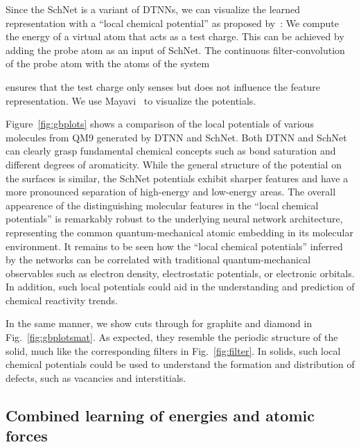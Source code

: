 \documentclass[aip,jcp,reprint,graphicx]{revtex4-1}
\begin{document}
Since the SchNet is a variant of DTNNs, we can visualize the learned representation with a ``local chemical potential''  as proposed by~\citet{schutt2017quantum}:
We compute the energy of a virtual atom that acts as a test charge.
This can be achieved by adding the probe atom  as an input of SchNet.
The continuous filter-convolution of the probe atom with the atoms of the system

ensures that the test charge only senses but does not influence the feature representation.
We use Mayavi~\cite{ramachandran2011mayavi} to visualize the potentials.

Figure~\ref{fig:gbplots} shows a comparison of the local potentials of various molecules from QM9 generated by DTNN and SchNet. Both DTNN and SchNet can clearly grasp fundamental chemical concepts such as bond saturation and different degrees of aromaticity. While the general structure of the potential on the surfaces is similar, the SchNet potentials exhibit sharper features and have a more pronounced separation of high-energy and low-energy areas. The overall appearence of the distinguishing molecular features in the ``local chemical potentials'' is remarkably robust to the underlying neural network architecture, representing the common quantum-mechanical atomic embedding in its molecular environment. It remains to be seen how the ``local chemical potentials'' inferred by the networks can be correlated with traditional quantum-mechanical observables such as electron density, electrostatic potentials, or electronic orbitals. In addition, such local potentials could aid in the understanding and prediction of chemical reactivity trends.  

In the same manner, we show cuts through  for graphite and diamond in Fig.~\ref{fig:gbplotsmat}.
As expected, they resemble the periodic structure of the solid, much like the corresponding filters in Fig.~\ref{fig:filter}. In solids, such local chemical potentials could be used to understand the formation and distribution of defects, such as vacancies and interstitials.

\subsection{Combined learning of energies and atomic forces}
\end{document}
